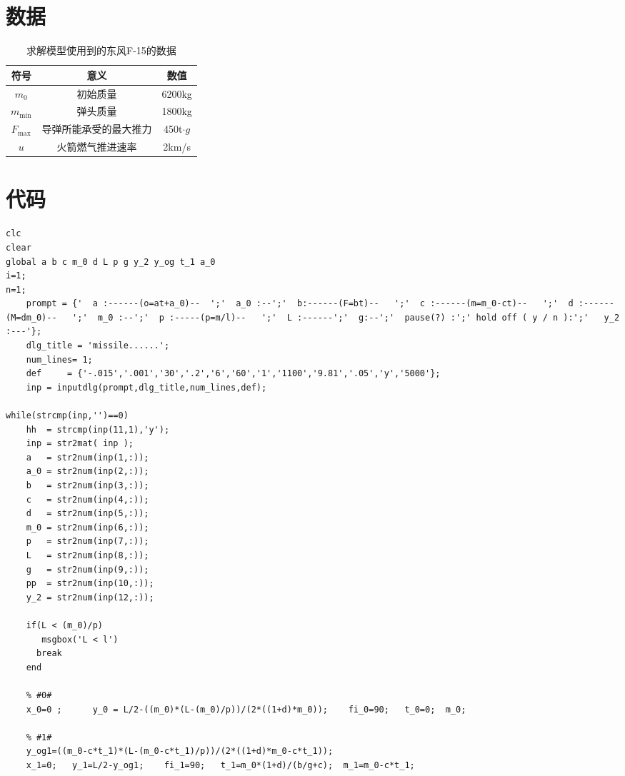 \documentclass[UTF8]{article}
\begin{document}
\begin{appendix}
\section{数据}
\begin{table}[htbp]
\centering
\caption{求解模型使用到的东风F-15的数据}
\begin{tabular}{|c|c|c|}
\hline
符号&意义&数值\\
\hline
\(m_0\)&初始质量&6200kg\\
\hline
\(m_\textrm{min}\)&弹头质量&1800kg\\
\hline
\(F_\textrm{max}\)&导弹所能承受的最大推力&450t\(\cdot g\)\\
\hline
\(u\)&火箭燃气推进速率&2\textrm{km/s}\\
\hline
\end{tabular}
\end{table}

\section{代码}
\begin{lstlisting}[title=main.m, frame=shadowbox]
clc
clear
global a b c m_0 d L p g y_2 y_og t_1 a_0 
i=1;
n=1;
    prompt = {'  a :------(o=at+a_0)--  ';'  a_0 :--';'  b:------(F=bt)--   ';'  c :------(m=m_0-ct)--   ';'  d :------(M=dm_0)--   ';'  m_0 :--';'  p :-----(p=m/l)--   ';'  L :------';'  g:--';'  pause(?) :';' hold off ( y / n ):';'   y_2 :---'};
    dlg_title = 'missile......';
    num_lines= 1;
    def     = {'-.015','.001','30','.2','6','60','1','1100','9.81','.05','y','5000'};
    inp = inputdlg(prompt,dlg_title,num_lines,def);

while(strcmp(inp,'')==0)
    hh  = strcmp(inp(11,1),'y');
    inp = str2mat( inp );
    a   = str2num(inp(1,:));
    a_0 = str2num(inp(2,:));
    b   = str2num(inp(3,:));
    c   = str2num(inp(4,:));
    d   = str2num(inp(5,:));
    m_0 = str2num(inp(6,:));
    p   = str2num(inp(7,:));
    L   = str2num(inp(8,:));
    g   = str2num(inp(9,:));
    pp  = str2num(inp(10,:));
    y_2 = str2num(inp(12,:));
    
    if(L < (m_0)/p)
       msgbox('L < l')
      break
    end
    
    % #0# 
    x_0=0 ;      y_0 = L/2-((m_0)*(L-(m_0)/p))/(2*((1+d)*m_0));    fi_0=90;   t_0=0;  m_0;

    % #1# 
    y_og1=((m_0-c*t_1)*(L-(m_0-c*t_1)/p))/(2*((1+d)*m_0-c*t_1));
    x_1=0;   y_1=L/2-y_og1;    fi_1=90;   t_1=m_0*(1+d)/(b/g+c);  m_1=m_0-c*t_1;
  

\end{lstlisting}
\end{appendix}
\end{document}
